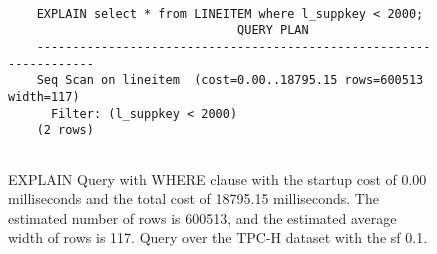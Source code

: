 
\begin{figure}[h]
\centering
    \begin{verbatim}

    EXPLAIN select * from LINEITEM where l_suppkey < 2000;
                                QUERY PLAN
    -------------------------------------------------------------------
    Seq Scan on lineitem  (cost=0.00..18795.15 rows=600513 width=117)
      Filter: (l_suppkey < 2000)
    (2 rows)
    
    \end{verbatim}

\caption[EXPLAIN Query with WHERE clause]{EXPLAIN Query with WHERE clause with the startup cost of 0.00 milliseconds and the total cost of 18795.15 milliseconds. The estimated number of rows is 600513, and the estimated average width of rows is 117. Query over the TPC-H dataset with the \acrshort{sf} 0.1.}
\label{fig:query-where}
\end{figure}
